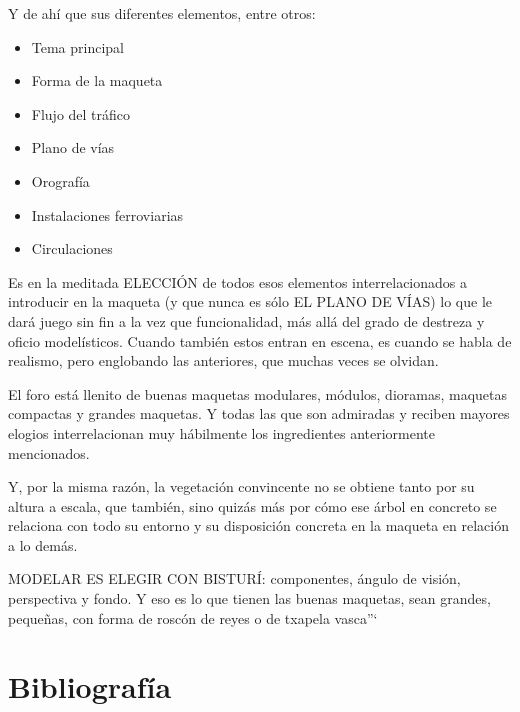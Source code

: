 Y de ahí que sus diferentes elementos, entre otros:
\begin{itemize}
	\item Tema principal
	\item Forma de la maqueta
	\item Flujo del tráfico
	\item Plano de vías
	\item Orografía
	\item Instalaciones ferroviarias
	\item Circulaciones
\end{itemize}


Es en la meditada ELECCIÓN de todos esos elementos interrelacionados a introducir en la maqueta (y que nunca es sólo EL PLANO DE VÍAS) lo que le dará juego sin fin a la vez que funcionalidad, más allá del grado de destreza y oficio modelísticos. Cuando también estos entran en escena, es cuando se habla de realismo, pero englobando las anteriores, que muchas veces se olvidan.

El foro está llenito de buenas maquetas modulares, módulos, dioramas, maquetas compactas y grandes maquetas.
Y todas las que son admiradas y reciben mayores elogios interrelacionan muy hábilmente los ingredientes anteriormente mencionados.

Y, por la misma razón, la vegetación convincente no se obtiene tanto por su altura a escala, que también, sino quizás más por cómo ese árbol en concreto se relaciona con todo su entorno y su disposición concreta en la maqueta en relación a lo demás.

MODELAR ES ELEGIR CON BISTURÍ: componentes, ángulo de visión, perspectiva y fondo. Y eso es lo que tienen las buenas maquetas, sean grandes, pequeñas, con forma de roscón de reyes o de txapela vasca''` \cite{carrington2021}

\section{Bibliografía}
\printbibliography[heading=subbibliography]
